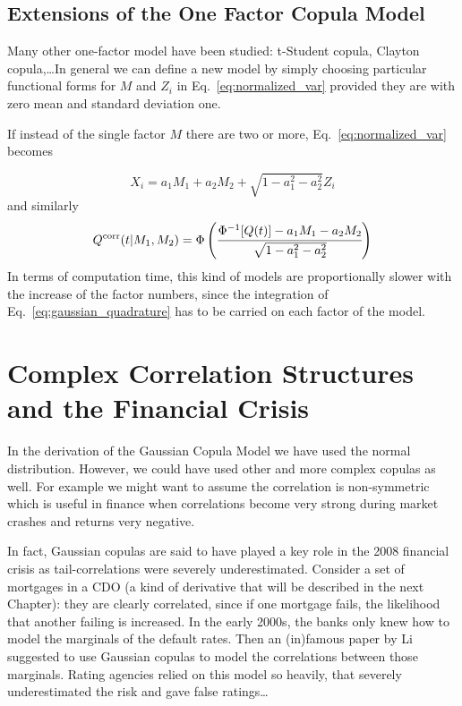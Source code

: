 \subsection{Extensions of the One Factor Copula Model}
Many other one-factor model have been studied: t-Student copula, Clayton copula,\ldots In general we can define a new model by simply choosing particular functional forms for $M$ and $Z_i$ in Eq.~\ref{eq:normalized_var} provided they are with zero mean and standard deviation one. 

If instead of the single factor $M$ there are two or more, Eq.~\ref{eq:normalized_var} becomes

\begin{equation}
X_i = a_1 M_1 + a_2 M_2 + \sqrt{1 - a_1^2 - a^2_2}Z_i
\end{equation}
and similarly
\begin{equation}
Q^{\textrm{corr}}(t|M_1, M_2) = \Phi\left(\cfrac{\Phi^{-1}[Q(t)]-a_1 M_1 - a_2 M_2}{\sqrt{1 - a_1^2 - a^2_2}}\right)
\end{equation}
In terms of computation time, this kind of models are proportionally slower with the increase of the factor numbers, since the integration of Eq.~\ref{eq:gaussian_quadrature} has to be carried on each factor of the model.

\section{Complex Correlation Structures and the Financial Crisis}
\label{complex-correlation-structures-and-the-financial-crisis}

In the derivation of the Gaussian Copula Model we have used the normal distribution. However, we could have used other and more complex copulas as well. For example we might want to assume the correlation is non-symmetric which is useful in finance when correlations become very strong during market crashes and returns very negative.

In fact, Gaussian copulas are said to have played a key role in the 2008 financial crisis as tail-correlations were severely underestimated. Consider a set of mortgages in a CDO (a kind of derivative that will be described in the next Chapter): they are clearly correlated, since if one mortgage fails, the likelihood that another failing is increased. In the early 2000s, the banks only knew how to model the marginals of the default rates. Then an (in)famous paper by Li~\cite{bib:copula_li} suggested to use Gaussian copulas to model the correlations between those marginals. Rating agencies relied on this model so heavily, that severely underestimated the risk and gave false ratings\ldots

